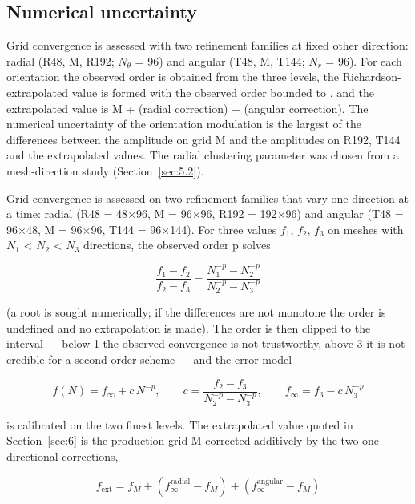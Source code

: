 \documentclass[preprint,12pt]{elsarticle}
\begin{document}
\subsection{Numerical uncertainty}
\label{sec:4.8}

Grid convergence is assessed with two refinement families at fixed other direction: radial (R48, M, R192; $N_{\theta}$ = 96) and angular (T48, M, T144; $N_{r}$ = 96). For each orientation the observed order is obtained from the three levels, the Richardson-extrapolated value is formed with the observed order bounded to \cite{florence1959,chao2001}, and the extrapolated value is M + (radial correction) + (angular correction). The numerical uncertainty of the orientation modulation is the largest of the differences between the amplitude on grid M and the amplitudes on R192, T144 and the extrapolated values. The radial clustering parameter was chosen from a mesh-direction study (Section~\ref{sec:5.2}).

Grid convergence is assessed on two refinement families that vary one direction at a time: radial (R48 = 48$\times$96, M = 96$\times$96, R192 = 192$\times$96) and angular (T48 = 96$\times$48, M = 96$\times$96, T144 = 96$\times$144). For three values $f_{1}$, $f_{2}$, $f_{3}$ on meshes with $N_{1}$ < $N_{2}$ < $N_{3}$ directions, the observed order p solves

\begin{equation}
\frac{f_1-f_2}{f_2-f_3}=\frac{N_1^{-p}-N_2^{-p}}{N_2^{-p}-N_3^{-p}} 
\label{eq:81}
\end{equation}

(a root is sought numerically; if the differences are not monotone the order is undefined and no extrapolation is made). The order is then clipped to the interval \cite{florence1959,chao2001} --- below 1 the observed convergence is not trustworthy, above 3 it is not credible for a second-order scheme --- and the error model

\begin{equation}
f(N)=f_\infty+c\,N^{-p},\qquad c=\frac{f_2-f_3}{N_2^{-p}-N_3^{-p}},\qquad f_\infty=f_3-c\,N_3^{-p} 
\label{eq:82}
\end{equation}

is calibrated on the two finest levels. The extrapolated value quoted in Section~\ref{sec:6} is the production grid M corrected additively by the two one-directional corrections,

\begin{equation}
f_{\mathrm{ext}}=f_M+\left(f_\infty^{\mathrm{radial}}-f_M\right)+\left(f_\infty^{\mathrm{angular}}-f_M\right) 
\label{eq:83}
\end{equation}
\end{document}
